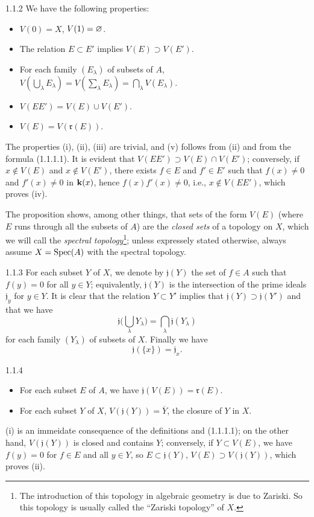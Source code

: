 \documentclass[../main.tex]{subfiles}
\begin{document}
\begin{env}[Proposition]{1.1.2}
We have the following properties:
\begin{itemize}
  \item[(i)] $V(0)=X$, $V(1)=\varnothing$.
  \item[(ii)] The relation $E\subset E'$ implies $V(E)\supset V(E')$.
  \item[(iii)] For each family $(E_\lambda)$ of subsets of $A$,
               $V(\bigcup_\lambda E_\lambda)=V(\sum_\lambda E_\lambda)=\bigcap_\lambda V(E_\lambda)$.
  \item[(iv)] $V(EE')=V(E)\cup V(E')$.
  \item[(v)] $V(E)=V(\mathfrak{r}(E))$.
\end{itemize}
\end{env}
The properties (i), (ii), (iii) are trivial, and (v) follows from (ii) and from the
formula (1.1.1.1). It is evident that $V(EE')\supset V(E)\cap V(E')$; conversely, if
$x\not\in V(E)$ and $x\not\in V(E')$, there exists $f\in E$ and $f'\in E'$ such that
$f(x)\neq 0$ and $f'(x)\neq 0$ in $\mathbf{k}(x)$, hence $f(x)f'(x)\neq 0$, i.e., $x\not\in V(EE')$,
which proves (iv).

The proposition  shows, among other things, that sets of the form $V(E)$ (where
$E$ runs through all the subsets of $A$) are the \emph{closed sets} of a topology on
$X$, which we will call the \emph{spectral topology}\footnote{The introduction of this
topology in algebraic geometry is due to Zariski. So this topology is usually called
the ``Zariski topology'' of $X$.}; unless expressely stated otherwise, always assume
$X=\operatorname{Spec}(A)$ with the spectral topology.

\begin{env}{1.1.3}
For each subset $Y$ of $X$, we denote by $\mathfrak{j}(Y)$ the set of $f\in A$
such that $f(y)=0$ for all $y\in Y$; equivalently, $\mathfrak{j}(Y)$ is the intersection of
the prime ideals $\mathfrak{j}_y$ for $y\in Y$. It is clear that the relation $Y\subset Y'$
implies that $\mathfrak{j}(Y)\supset\mathfrak{j}(Y')$ and that we have
\[
  \mathfrak{j}\bigg(\bigcup_\lambda Y_\lambda\bigg)=\bigcap_\lambda\mathfrak{j}(Y_\lambda)\tag{1.1.3.1}
\]
for each family $(Y_\lambda)$ of subsets of $X$. Finally we have
\[
  \mathfrak{j}(\{x\})=\mathfrak{j}_x.\tag{1.1.3.2}
\]
\end{env}

\begin{env}[Proposition]{1.1.4}
\begin{itemize}
  \item[(i)] For each subset $E$ of $A$, we have $\mathfrak{j}(V(E))=\mathfrak{r}(E)$.
  \item[(ii)] For each subset $Y$ of $X$, $V(\mathfrak{j}(Y))=\overline{Y}$, the closure of $Y$ in $X$.
\end{itemize}
\end{env}
(i) is an immeidate consequence of the definitions and (1.1.1.1); on the other hand, $V(\mathfrak{j}(Y))$
is closed and contains $Y$; conversely, if $Y\subset V(E)$, we have $f(y)=0$ for $f\in E$ and all $y\in Y$,
so $E\subset\mathfrak{j}(Y)$, $V(E)\supset V(\mathfrak{j}(Y))$, which proves (ii).
\end{document}

